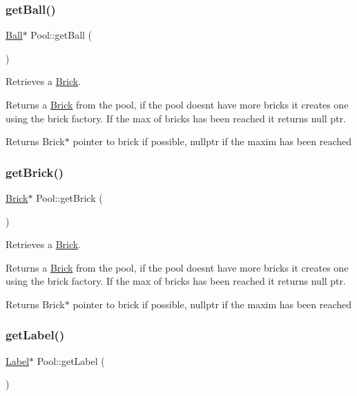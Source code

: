 \subsubsection{\texorpdfstring{get\+Ball()}{getBall()}}
{\footnotesize\ttfamily \hyperlink{class_ball}{Ball}$\ast$ Pool\+::get\+Ball (\begin{DoxyParamCaption}{ }\end{DoxyParamCaption})}



Retrieves a \hyperlink{class_brick}{Brick}. 

Returns a \hyperlink{class_brick}{Brick} from the pool, if the pool doesn\textquotesingle{}t have more bricks it creates one using the brick factory. If the max of bricks has been reached it returns null ptr.

\begin{DoxyReturn}{Returns}
Brick$\ast$ pointer to brick if possible, nullptr if the maxim has been reached 
\end{DoxyReturn}
\mbox{\label{class_pool_a9a51a508e2d90cb62888dd64ebf16a92}} 
\subsubsection{\texorpdfstring{get\+Brick()}{getBrick()}}
{\footnotesize\ttfamily \hyperlink{class_brick}{Brick}$\ast$ Pool\+::get\+Brick (\begin{DoxyParamCaption}{ }\end{DoxyParamCaption})}



Retrieves a \hyperlink{class_brick}{Brick}. 

Returns a \hyperlink{class_brick}{Brick} from the pool, if the pool doesn\textquotesingle{}t have more bricks it creates one using the brick factory. If the max of bricks has been reached it returns null ptr.

\begin{DoxyReturn}{Returns}
Brick$\ast$ pointer to brick if possible, nullptr if the maxim has been reached 
\end{DoxyReturn}
\mbox{\label{class_pool_a13ce02d7dbee29305a83dcdb22a01661}} 
\subsubsection{\texorpdfstring{get\+Label()}{getLabel()}}
{\footnotesize\ttfamily \hyperlink{class_label}{Label}$\ast$ Pool\+::get\+Label (\begin{DoxyParamCaption}{ }\end{DoxyParamCaption})}



